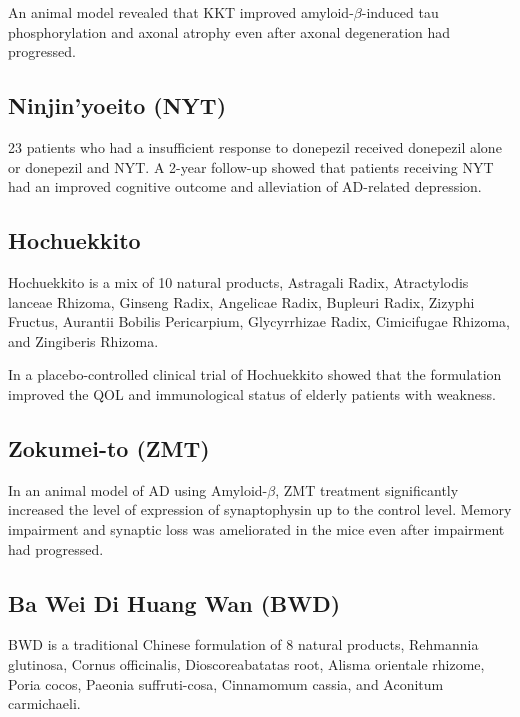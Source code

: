 \documentclass[twocolumn]{article}
\begin{document}
An animal model revealed that KKT
improved amyloid-$\beta$-induced tau phosphorylation and axonal atrophy
even after axonal degeneration had progressed.
\cite{watari2014new, watari2015comparing}




\subsection{Ninjin'yoeito (NYT)}


23 patients who had a insufficient response to donepezil
received donepezil alone or donepezil and NYT.
A 2-year follow-up showed that patients receiving NYT
had an improved cognitive outcome and alleviation of AD-related depression.
\cite{kudoh2015effect}





\subsection{Hochuekkito}
Hochuekkito is a mix of 10 natural products,
Astragali Radix,
Atractylodis lanceae Rhizoma,
Ginseng Radix,
Angelicae Radix,
Bupleuri Radix,
Zizyphi Fructus,
Aurantii Bobilis Pericarpium,
Glycyrrhizae Radix,
Cimicifugae Rhizoma,
and Zingiberis Rhizoma.
\cite{kiyohara2011polysaccharide}

In a placebo-controlled clinical trial of Hochuekkito
showed that the formulation improved the QOL and immunological status
of elderly patients with weakness.
\cite{satoh2005randomized}

\subsection{Zokumei-to (ZMT)}

In an animal model of AD using Amyloid-$\beta$,
ZMT treatment significantly increased the level of expression of
synaptophysin up to the control level.
Memory impairment and synaptic loss was ameliorated in the mice
even after impairment had progressed.
\cite{tohda2003repair}



\subsection{Ba Wei Di Huang Wan (BWD)}
BWD is a traditional Chinese formulation of 8 natural products,
Rehmannia glutinosa,
Cornus officinalis,
Dioscoreabatatas root,
Alisma orientale rhizome,
Poria cocos,
Paeonia suffruti-cosa,
Cinnamomum cassia,
and Aconitum carmichaeli.
\end{document}
